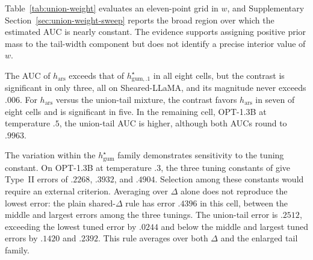 \documentclass[11pt]{article}
\begin{document}
Table~\ref{tab:union-weight} evaluates an eleven-point grid in $w$, and Supplementary Section~\ref{sec:union-weight-sweep} reports the broad region over which the estimated AUC is nearly constant.  The evidence supports assigning positive prior mass to the tail-width component but does not identify a precise interior value of $w$.

The AUC of $h_{\mathrm{ars}}$ exceeds that of $h^\star_{\mathrm{gum},.1}$ in all eight cells, but the contrast is significant in only three, all on Sheared-LLaMA, and its magnitude never exceeds $.006$.  For $h_{\mathrm{ars}}$ versus the union-tail mixture, the contrast favors $h_{\mathrm{ars}}$ in seven of eight cells and is significant in five.  In the remaining cell, OPT-1.3B at temperature $.5$, the union-tail AUC is higher, although both AUCs round to $.9963$.

The variation within the $h^\star_{\mathrm{gum}}$ family demonstrates sensitivity to the tuning constant.  On OPT-1.3B at temperature $.3$, the three tuning constants of \citet{li2025framework} give Type~II errors of $.2268$, $.3932$, and $.4904$.  Selection among these constants would require an external criterion.  Averaging over $\Delta$ alone does not reproduce the lowest error: the plain shared-$\Delta$ rule has error $.4396$ in this cell, between the middle and largest errors among the three tunings.  The union-tail error is $.2512$, exceeding the lowest tuned error by $.0244$ and below the middle and largest tuned errors by $.1420$ and $.2392$.  This rule averages over both $\Delta$ and the enlarged tail family.
\end{document}
